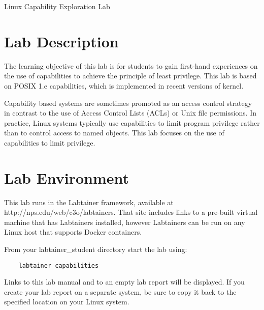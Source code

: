 




\begin{center}
{\LARGE Linux Capability Exploration Lab}
\end{center}

\copyrightnotice

\section{Lab Description}

The learning objective of this lab is for students
to gain first-hand experiences on the
use of capabilities to achieve the principle of least privilege.
This lab is based on POSIX 1.e capabilities, which is implemented in
recent versions of \linux kernel.

Capability based systems are sometimes promoted as an access control
strategy in contrast to the use of Access Control Lists (ACLs) or
Unix file permissions.  In practice, Linux systems typically use 
capabilities to limit program privilege rather than to control
access to named objects.  This lab focuses on the use of capabilities
to limit privilege.

\section{Lab Environment}
This lab runs in the Labtainer framework,
available at http://nps.edu/web/c3o/labtainers.
That site includes links to a pre-built virtual machine
that has Labtainers installed, however Labtainers can
be run on any Linux host that supports Docker containers.

From your labtainer_student directory start the lab using:
\begin{verbatim}
    labtainer capabilities
\end{verbatim}
Links to this lab manual and to an empty lab report will be displayed.  If you create your lab report on a separate system,
be sure to copy it back to the specified location on your Linux system.

